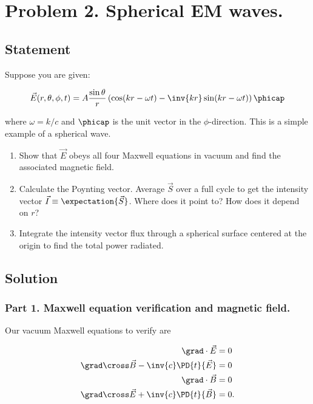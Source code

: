 \section{Problem 2.  Spherical EM waves.}

\subsection{Statement}

Suppose you are given:

\begin{equation}\label{eqn:relElectroDynProblemSet4:400}
\vec{E}(r, \theta, \phi, t) = A \frac{\sin\theta}{r} \left( \cos(k r - \omega t) - \inv{kr} \sin(k r - \omega t) \right) \phicap
\end{equation}

where $\omega = k/c$ and $\phicap$ is the unit vector in the $\phi$-direction.  This is a simple example of a spherical wave.

\begin{enumerate}
\item Show that $\vec{E}$ obeys all four Maxwell equations in vacuum and find the associated magnetic field.
\item Calculate the Poynting vector.  Average $\vec{S}$ over a full cycle to get the intensity vector $\vec{I} \equiv \expectation{\vec{S}}$.  Where does it point to?  How does it depend on $r$?
\item Integrate the intensity vector flux through a spherical surface centered at the origin to find the total power radiated.
\end{enumerate}

\subsection{Solution}

\subsubsection{Part 1.  Maxwell equation verification and magnetic field.}

Our vacuum Maxwell equations to verify are

\begin{align}\label{eqn:relElectroDynProblemSet4:420}
\grad \cdot \vec{E} &= 0 \\
\grad \cross \vec{B} -\inv{c} \PD{t}{\vec{E}} &= 0 \\
\grad \cdot \vec{B} &= 0 \\
\grad \cross \vec{E} +\inv{c} \PD{t}{\vec{B}} &= 0.
\end{align}

